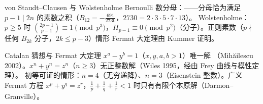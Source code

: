 \begin{结论}{von Staudt--Clausen 与 Wolstenholme}
Bernoulli 数分母：——分母恰为满足 $p-1\mid2n$ 的素数之积（$B_{12}=-\frac{691}{2730}$，$2730=2\cdot3\cdot5\cdot7\cdot13$）。
Wolstenholme：$p\ge5$ 时 $\binom{2p-1}{p-1}\equiv1\pmod{p^3}$，$H_{p-1}\equiv0\pmod{p^2}$（分子）。正则素数（$p\nmid$ 任何 $B_{2k}$ 分子，$2k\le p-3$）情形 Fermat 大定理由 Kummer 证明。
\end{结论}

\begin{结论}{Catalan 猜想与 Fermat 大定理}
$x^a-y^b=1$（$x,y,a,b>1$）唯一解 （Mihăilescu 2002）。$x^n+y^n=z^n$（$n\ge3$）无正整数解（Wiles 1995，经由 Frey 曲线与模性定理）。
初等可证的情形：$n=4$（无穷递降）、$n=3$（Eisenstein 整数）。广义 Fermat 方程 $x^p+y^q=z^r$，$\frac1p+\frac1q+\frac1r<1$ 时只有有限个本原解（Darmon--Granville）。
\end{结论}


